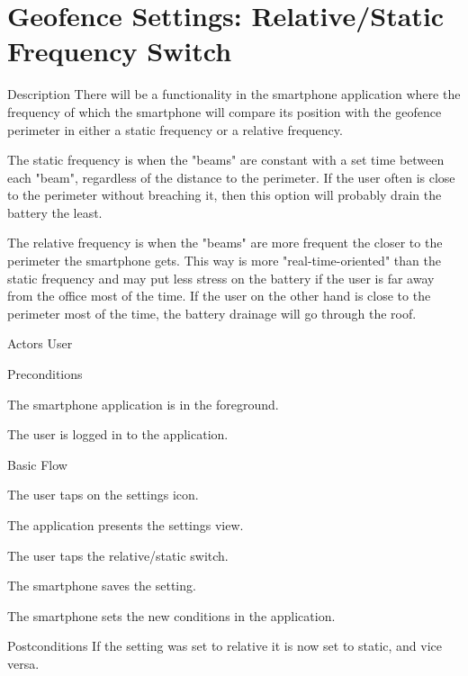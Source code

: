 \section{Geofence Settings: Relative/Static Frequency Switch}

%
\begin{cpart}{Description}
There will be a functionality in the smartphone application where the frequency of which the smartphone will compare its position with the geofence perimeter in either a static frequency or a relative frequency.

The static frequency is when the "beams" are constant with a set time between each "beam", regardless of the distance to the perimeter. If the user often is close to the perimeter without breaching it, then this option will probably drain the battery the least.

The relative frequency is when the "beams" are more frequent the closer to the perimeter the smartphone gets. This way is more "real-time-oriented" than the static frequency and may put less stress on the battery if the user is far away from the office most of the time. If the user on the other hand is close to the perimeter most of the time, the battery drainage will go through the roof.
\end{cpart}


%
\begin{cpart}{Actors}
User
\end{cpart}

%
\begin{cpartList}{Preconditions}
\item The smartphone application is in the foreground.
\item The user is logged in to the application.
\end{cpartList}

%
\begin{cpartList}{Basic Flow}
  \item The user taps on the settings icon.
  \item The application presents the settings view.
  \item The user taps the relative/static switch.
  \item The smartphone saves the setting.
  \item The smartphone sets the new conditions in the application.
\end{cpartList}

%
\begin{cpart}{Postconditions}
If the setting was set to relative it is now set to static, and vice versa.
\end{cpart}

\clearpage
